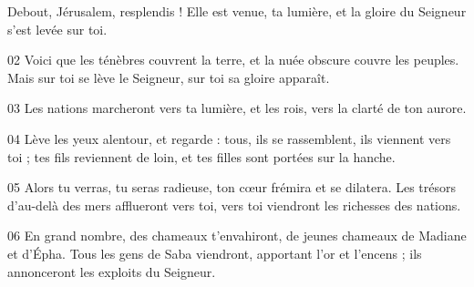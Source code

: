 Debout, Jérusalem, resplendis ! Elle est venue, ta lumière, et la gloire du Seigneur s’est levée sur toi.

02 Voici que les ténèbres couvrent la terre, et la nuée obscure couvre les peuples. Mais sur toi se lève le Seigneur, sur toi sa gloire apparaît.

03 Les nations marcheront vers ta lumière, et les rois, vers la clarté de ton aurore.

04 Lève les yeux alentour, et regarde : tous, ils se rassemblent, ils viennent vers toi ; tes fils reviennent de loin, et tes filles sont portées sur la hanche.

05 Alors tu verras, tu seras radieuse, ton cœur frémira et se dilatera. Les trésors d’au-delà des mers afflueront vers toi, vers toi viendront les richesses des nations.

06 En grand nombre, des chameaux t’envahiront, de jeunes chameaux de Madiane et d’Épha. Tous les gens de Saba viendront, apportant l’or et l’encens ; ils annonceront les exploits du Seigneur.